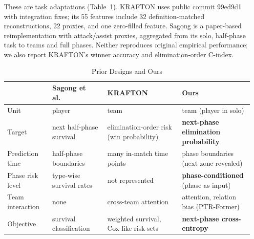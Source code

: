 \documentclass[sigconf,anonymous,nonacm]{acmart}
\begin{document}
These are task adaptations (Table~\ref{tab:compare}). KRAFTON uses public commit 99ed9d1 with integration fixes; its 55 features include 32 definition-matched reconstructions, 22 proxies, and one zero-filled feature. Sagong is a paper-based reimplementation with attack/assist proxies, aggregated from its solo, half-phase task to teams and full phases. Neither reproduces original empirical performance; we also report KRAFTON's winner accuracy and elimination-order C-index.

\begin{table}[t]
\centering
\caption{Prior Designs and Ours}
\label{tab:compare}
\footnotesize
\setlength{\tabcolsep}{3pt}
\begin{tabular}{p{}p{}p{}p{}}
\hline
 & Sagong et al.~\cite{Sagong25a} & KRAFTON~\cite{KRAFTON} & Ours \\
\hline
Unit & player & team & team (player in solo) \\
Target & next half-phase survival & elimination-order risk (win probability) & \textbf{next-phase elimination probability} \\
Prediction time & half-phase boundaries & many in-match time points & phase boundaries (next zone revealed) \\
Phase risk level & type-wise survival rates & not represented & \textbf{phase-conditioned} (phase as input) \\
Team interaction & none & cross-team attention & attention, relation bias (PTR-Former) \\
Objective & survival classification & weighted survival, Cox-like risk sets & \textbf{next-phase cross-entropy} \\
\hline
\end{tabular}
\end{table}
\end{document}
